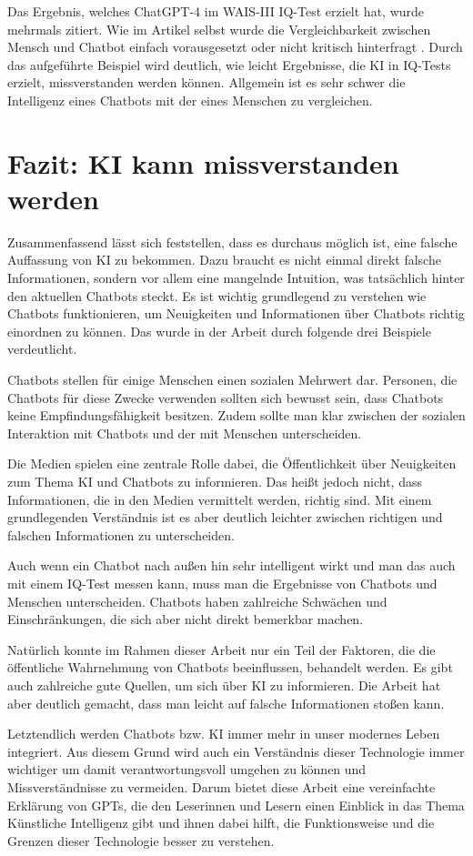 	Das Ergebnis, welches ChatGPT-4 im WAIS-III IQ-Test erzielt hat, wurde mehrmals zitiert. Wie im Artikel selbst wurde die
	Vergleichbarkeit zwischen Mensch und Chatbot einfach vorausgesetzt \cite{gawdat23} oder nicht kritisch hinterfragt 
	\cite{blutermann23}. Durch das aufgeführte Beispiel wird deutlich, wie leicht Ergebnisse, die KI in IQ-Tests erzielt, missverstanden
	werden können. Allgemein ist es sehr schwer die Intelligenz eines Chatbots mit der eines Menschen zu vergleichen. 
	
\clearpage
\section{Fazit: KI kann missverstanden werden}
Zusammenfassend lässt sich feststellen, dass es durchaus möglich ist, eine falsche Auffassung von KI zu bekommen. Dazu braucht es nicht
einmal direkt falsche Informationen, sondern vor allem eine mangelnde Intuition, was tatsächlich hinter den aktuellen Chatbots steckt.
Es ist wichtig grundlegend zu verstehen wie Chatbots funktionieren, um Neuigkeiten und Informationen über Chatbots richtig einordnen zu können.   
Das wurde in der Arbeit durch folgende drei Beispiele verdeutlicht.

Chatbots stellen für einige Menschen einen sozialen Mehrwert dar. Personen, die Chatbots für diese Zwecke verwenden sollten sich bewusst sein,
dass Chatbots keine Empfindungsfähigkeit besitzen. Zudem sollte man klar zwischen der sozialen Interaktion mit Chatbots und der mit Menschen unterscheiden.

Die Medien spielen eine zentrale Rolle dabei, die Öffentlichkeit über Neuigkeiten zum Thema KI und Chatbots zu informieren. Das heißt jedoch nicht,
dass Informationen, die in den Medien vermittelt werden, richtig sind. Mit einem grundlegenden Verständnis ist es aber deutlich leichter zwischen richtigen und
falschen Informationen zu unterscheiden.     

Auch wenn ein Chatbot nach außen hin sehr intelligent wirkt und man das auch mit einem IQ-Test messen kann, muss man die Ergebnisse von Chatbots
und Menschen unterscheiden. Chatbots haben zahlreiche Schwächen und Einschränkungen, die sich aber nicht direkt bemerkbar machen. 

Natürlich konnte im Rahmen dieser Arbeit nur ein Teil der Faktoren, die die öffentliche Wahrnehmung von Chatbots beeinflussen, behandelt werden. 
Es gibt auch zahlreiche gute Quellen, um sich über KI zu informieren. Die Arbeit hat aber deutlich gemacht, dass man leicht auf falsche Informationen
stoßen kann.

Letztendlich werden Chatbots bzw. KI immer mehr in unser modernes Leben integriert. Aus diesem Grund wird auch ein Verständnis dieser Technologie immer wichtiger
um damit verantwortungsvoll umgehen zu können und Missverständnisse zu vermeiden. Darum bietet diese Arbeit eine vereinfachte Erklärung von GPTs, 
die den Leserinnen und Lesern einen Einblick in das Thema Künstliche Intelligenz gibt und ihnen dabei hilft, die Funktionsweise und die Grenzen dieser 
Technologie besser zu verstehen. 


